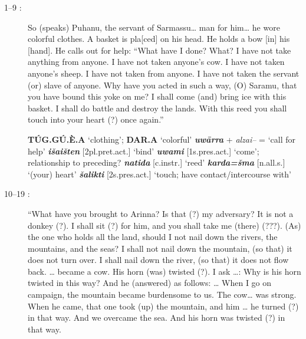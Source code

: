 \documentclass[10pt]{article}
\newcommand{\bit}[1]{\textbf{\textit{#1}}}				%
\newcommand{\p}[1]{{\tiny[{#1}]}}					%
\newcommand{\hith}{\textsubwedge{h}}
\renewcommand{\.}[1]{\textsubdot{#1}}
\begin{document}
\begin{description}

\item[1--9 :] So (speaks) Puhanu, the servant of Sarmassu{\ldots} man for him{\ldots} he wore colorful clothes. A basket is pla[ced] on his head. He holds a bow [in] his [hand]. He calls out for help: ``What have I done? What? I have not take anything from anyone. I have not taken anyone's cow. I have not taken anyone's sheep. I have not taken from anyone. I have not taken the servant (or) slave of anyone. Why have you acted in such a way, (O) Saramu, that you have bound this yoke on me? I shall come (and) bring ice with this basket. I shall do battle and destroy the lands. With this reed you shall touch into your heart (?) once again.''

\begin{notes}

\textbf{T\'UG.G\'U.\`E.A} `clothing'; \textbf{DAR.A} `colorful' \bit{uw\=arra} + \textit{{\hith}alzai--} = `call for help'  \bit{i\v{s}{\hith}ai\v{s}ten} \p{2pl.pret.act.} `bind' \bit{uwami} \p{1s.pres.act.} `come'; relationship to preceding? \bit{natida} \p{c.instr.} `reed' \bit{karda=\v{s}ma} \p{n.all.s.} `(your) heart' \bit{\v{s}alikti} \p{2s.pres.act.} `touch; have contact/intercourse with'

\end{notes}

\item[10--19 :] ``What have you brought to Arinna? Is that (?) my adversary? It is not a donkey (?). I shall sit (?) for him, and you shall take me (there) (???). (As) the one who holds all the land, should I not nail down the rivers, the mountains, and the seas? I shall not nail down the mountain, (so that) it does not turn over. I shall nail down the river, (so that) it does not flow back. {\ldots} became a cow. His horn (was) twisted (?). I ask {\ldots}: Why is his horn twisted in this way? And he (answered) as follows: {\ldots} When I go on campaign, the mountain became burdensome to us. The cow{\ldots} was strong. When he came, that one  took (up) the mountain, and him {\ldots} he turned (?) in that way. And we overcame the sea. And his horn was twisted (?) in that way.


\begin{notes}


\end{notes}
\end{description}
\end{document}
